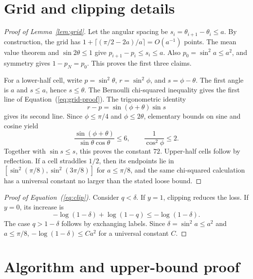 \documentclass{article}
\begin{document}
\section{Grid and clipping details}
\label{app:grid-proof}

\begin{proof}[Proof of Lemma~\ref{lem:grid}]
Let the angular spacing be $s_i=\theta_{i+1}-\theta_i\leq a$. By construction, the grid has $1+\lceil(\pi/2-2a)/a\rceil=O(a^{-1})$ points. The mean value theorem and $\sin2\theta\leq1$ give $p_{i+1}-p_i\leq s_i\leq a$. Also $p_0=\sin^2a\leq a^2$, and symmetry gives $1-p_N=p_0$. This proves the first three claims.

For a lower-half cell, write $p=\sin^2\theta$, $r=\sin^2\phi$, and $s=\phi-\theta$. The first angle is $a$ and $s\leq a$, hence $s\leq\theta$. The Bernoulli chi-squared inequality gives the first line of Equation~(\ref{eq:grid-proof}). The trigonometric identity \[ r-p=\sin(\phi+\theta)\sin s \] gives its second line. Since $\phi\leq\pi/4$ and $\phi\leq2\theta$, elementary bounds on sine and cosine yield \[ \frac{\sin(\phi+\theta)} {\sin\theta\cos\theta}\leq6, \qquad \frac1{\cos^2\phi}\leq2. \] Together with $\sin s\leq s$, this proves the constant $72$. Upper-half cells follow by reflection. If a cell straddles $1/2$, then its endpoints lie in $[\sin^2(\pi/8),\sin^2(3\pi/8)]$ for $a\leq\pi/8$, and the same chi-squared calculation has a universal constant no larger than the stated loose bound.
\end{proof}

\begin{proof}[Proof of Equation~(\ref{eq:clip})]
Consider $q<\delta$. If $y=1$, clipping reduces the loss. If $y=0$, its increase is \[ -\log(1-\delta)+\log(1-q) \leq-\log(1-\delta). \] The case $q>1-\delta$ follows by exchanging labels. Since $\delta=\sin^2a\leq a^2$ and $a\leq\pi/8$, $-\log(1-\delta)\leq C a^2$ for a universal constant $C$.
\end{proof}

\section{Algorithm and upper-bound proof}
\label{app:algorithm}
\end{document}
